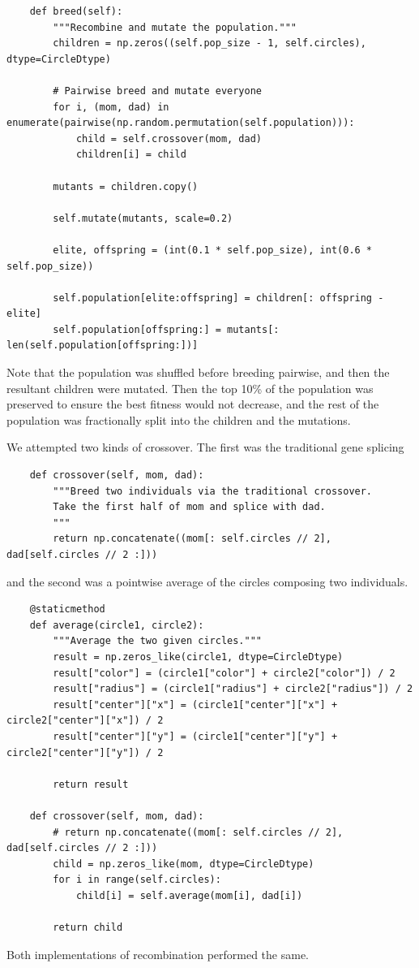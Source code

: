 \documentclass{article}
\begin{document}
\begin{verbatim}
    def breed(self):
        """Recombine and mutate the population."""
        children = np.zeros((self.pop_size - 1, self.circles), dtype=CircleDtype)

        # Pairwise breed and mutate everyone
        for i, (mom, dad) in enumerate(pairwise(np.random.permutation(self.population))):
            child = self.crossover(mom, dad)
            children[i] = child

        mutants = children.copy()

        self.mutate(mutants, scale=0.2)

        elite, offspring = (int(0.1 * self.pop_size), int(0.6 * self.pop_size))

        self.population[elite:offspring] = children[: offspring - elite]
        self.population[offspring:] = mutants[: len(self.population[offspring:])]
\end{verbatim}

Note that the population was shuffled before breeding pairwise, and then the resultant children
were mutated. Then the top 10\% of the population was preserved to ensure the best fitness would
not decrease, and the rest of the population was fractionally split into the children and the
mutations.

We attempted two kinds of crossover. The first was the traditional gene splicing

\begin{verbatim}
    def crossover(self, mom, dad):
        """Breed two individuals via the traditional crossover.
        Take the first half of mom and splice with dad.
        """
        return np.concatenate((mom[: self.circles // 2], dad[self.circles // 2 :]))
\end{verbatim}

and the second was a pointwise average of the circles composing two individuals.
\begin{verbatim}
    @staticmethod
    def average(circle1, circle2):
        """Average the two given circles."""
        result = np.zeros_like(circle1, dtype=CircleDtype)
        result["color"] = (circle1["color"] + circle2["color"]) / 2
        result["radius"] = (circle1["radius"] + circle2["radius"]) / 2
        result["center"]["x"] = (circle1["center"]["x"] + circle2["center"]["x"]) / 2
        result["center"]["y"] = (circle1["center"]["y"] + circle2["center"]["y"]) / 2

        return result

    def crossover(self, mom, dad):
        # return np.concatenate((mom[: self.circles // 2], dad[self.circles // 2 :]))
        child = np.zeros_like(mom, dtype=CircleDtype)
        for i in range(self.circles):
            child[i] = self.average(mom[i], dad[i])

        return child
\end{verbatim}
Both implementations of recombination performed the same.
\end{document}
